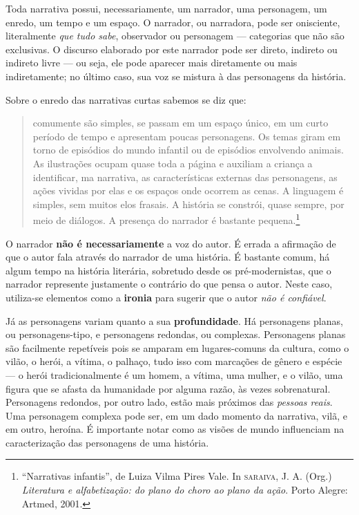\documentclass[11pt]{extarticle}
\begin{document}
Toda narrativa possui, necessariamente, um narrador, uma personagem, um enredo, um tempo e um espaço. O narrador, ou narradora, pode ser onisciente, literalmente \textit{que tudo sabe}, observador ou personagem --- categorias que não são exclusivas. O discurso elaborado por este narrador pode ser direto, indireto ou indireto livre --- ou seja, ele pode aparecer mais diretamente ou mais indiretamente; no último caso, sua voz se mistura à das personagens da história.

Sobre o enredo das narrativas curtas sabemos se diz que:

\begin{quote}
comumente são simples, se passam em um espaço único, em um curto período de tempo e apresentam poucas personagens. Os temas giram em torno de episódios do mundo infantil ou de episódios envolvendo animais. As ilustrações ocupam quase toda a página e auxiliam 
a criança a identificar, ma narrativa, as características externas das personagens, as ações vividas por elas e os espaços onde ocorrem as cenas. A linguagem é simples, sem muitos elos frasais. A história se constrói, quase sempre, por meio de diálogos. A presença do narrador é bastante pequena.\footnote{“Narrativas infantis”, de Luiza Vilma Pires Vale. In \textsc{saraiva}, J. A. (Org.) \textit{Literatura e alfabetização: do plano do choro ao plano da ação}. Porto Alegre: Artmed, 2001.}  
\end{quote}

O narrador \textbf{não é necessariamente} a voz do autor. É errada a afirmação de que o autor fala através do narrador de uma história. É bastante comum, há algum tempo na história literária, sobretudo desde os pré-modernistas, que o narrador represente justamente o contrário do que pensa o autor. Neste caso, utiliza-se elementos como a \textbf{ironia} para sugerir que o autor \textit{não é confiável}.

Já as personagens variam quanto a sua \textbf{profundidade}. Há personagens planas, ou personagens-tipo, e personagens redondas, ou complexas. Personagens planas são facilmente repetíveis pois se amparam em lugares-comuns da cultura, como o vilão, o herói, a vítima, o palhaço, tudo isso com marcações de gênero e espécie --- o herói tradicionalmente é um homem, a vítima, uma mulher, e o vilão, uma figura que se afasta da humanidade por alguma razão, às vezes sobrenatural. Personagens redondos, por outro lado, estão mais próximos das \textit{pessoas reais}. Uma personagem complexa pode ser, em um dado momento da narrativa, vilã, e em outro, heroína. É importante notar como as visões de mundo influenciam na caracterização das personagens de uma história.
\end{document}
